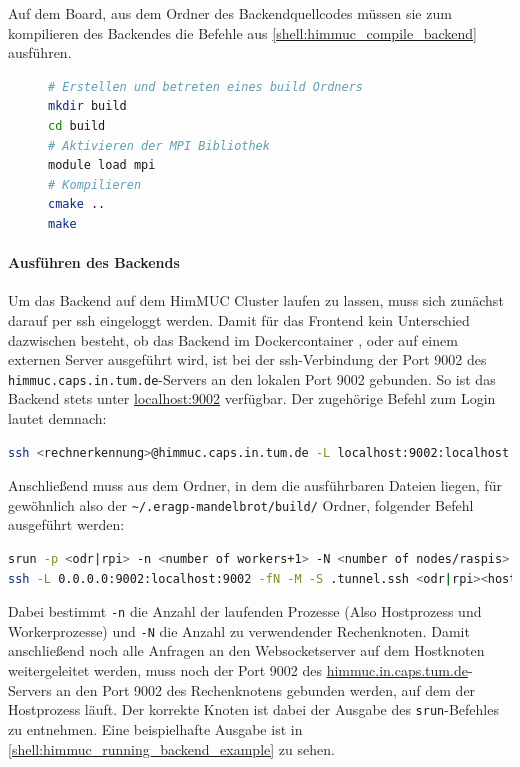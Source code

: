 Auf dem Board, aus dem Ordner des Backendquellcodes müssen sie zum kompilieren
des Backendes die Befehle aus \autoref{shell:himmuc_compile_backend} ausführen.

\begin{figure}[h!]
	\begin{lstlisting}[language=bash, caption={Kompilieren des Backends}, label={shell:himmuc_compile_backend}]
# Erstellen und betreten eines build Ordners
mkdir build
cd build
# Aktivieren der MPI Bibliothek
module load mpi
# Kompilieren
cmake ..
make
    \end{lstlisting}
\end{figure}


\paragraph{Ausführen des Backends}\label{par:himmuc_run_backend}

Um das Backend auf dem HimMUC Cluster laufen zu lassen, muss sich zunächst darauf per ssh eingeloggt werden.
Damit für das Frontend kein Unterschied dazwischen besteht, ob das Backend im Dockercontainer , oder
auf einem externen Server ausgeführt wird, ist bei der ssh-Verbindung der Port 9002
des \verb|himmuc.caps.in.tum.de|-Servers an den lokalen Port 9002 gebunden.
So ist das Backend stets unter \url{localhost:9002} verfügbar.
Der zugehörige Befehl zum Login lautet demnach:

\begin{lstlisting}[language=bash]
ssh <rechnerkennung>@himmuc.caps.in.tum.de -L localhost:9002:localhost:9002
\end{lstlisting}

Anschließend muss aus dem Ordner, in dem die ausführbaren Dateien liegen,
für gewöhnlich also der \verb|~/.eragp-mandelbrot/build/| Ordner,
folgender Befehl ausgeführt werden:

\begin{lstlisting}[language=bash]
srun -p <odr|rpi> -n <number of workers+1> -N <number of nodes/raspis> -l --multi-prog <path to eragp-mandelbrot/backend>/himmuc/run.conf &
ssh -L 0.0.0.0:9002:localhost:9002 -fN -M -S .tunnel.ssh <odr|rpi><host number>
\end{lstlisting}

Dabei bestimmt \verb|-n| die Anzahl der laufenden Prozesse (Also Hostprozess und Workerprozesse)
und \verb|-N| die Anzahl zu verwendender Rechenknoten.
Damit anschließend noch alle Anfragen an den Websocketserver auf dem Hostknoten weitergeleitet werden,
muss noch der Port 9002 des \url{himmuc.in.caps.tum.de}-Servers an den Port 9002 des Rechenknotens gebunden werden,
auf dem der Hostprozess läuft.
Der korrekte Knoten ist dabei der Ausgabe des \verb|srun|-Befehles zu entnehmen.
Eine beispielhafte Ausgabe ist in \autoref{shell:himmuc_running_backend_example} zu sehen.

